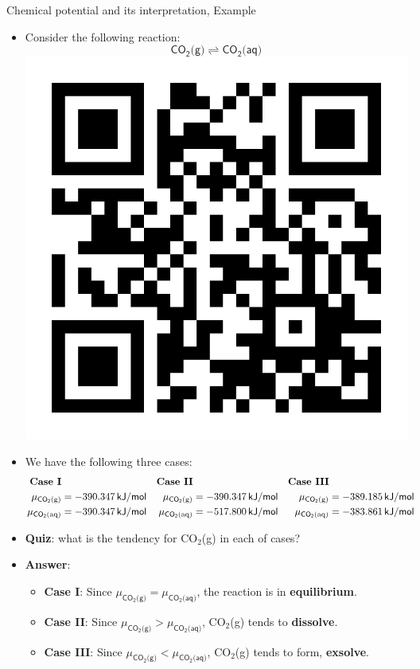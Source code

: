 \begin{frame}{Chemical potential and its interpretation, Example}
\begin{itemize}
\item Consider the following reaction:
\[
\mathsf{CO_{2}\text{(g)}\rightleftharpoons CO_{2}\text{(aq)}}
\]
\vskip -50pt
\includegraphics[height=0.17\columnwidth,right]{figures/chemical-equilibrium/poll-linear-independence.png}
\pause
\vskip -40pt
\item We have the following three cases: 
{
\footnotesize{}
\begin{align*}
\text{\textbf{Case I}} &  & \textbf{Case II} &  & \textbf{Case III}\\
\mu_{\mathsf{CO_{2}\text{(g)}}} & = -390.347\,{\mathsf{kJ/mol}} & 
\mu_{\mathsf{CO_{2}\text{(g)}}} & = -390.347\,{\mathsf{kJ/mol}} & 
\mu_{\mathsf{CO_{2}\text{(g)}}} & = -389.185\,{\mathsf{kJ/mol}}\\
\mu_{\mathsf{CO_{2}\text{(aq)}}} & = -390.347\,{\mathsf{kJ/mol}} & \mu_{\mathsf{CO_{2}\text{(aq)}}} & = -517.800\,{{\mathsf{kJ/mol}}} & \mu_{\mathsf{CO_{2}\text{(aq)}}} & =-383.861\,{\mathsf{kJ/mol}}
\end{align*}
}{\footnotesize\par}
\vskip 10pt 
%
\pause
\item \alert{\textbf{Quiz}}: what is the tendency for CO$_{2}$(g) in each of cases?
%
\hiddenpause
%
\item \alert{\textbf{Answer}}:
\begin{itemize}
\item \textbf{Case I}: Since $\mu_{\mathsf{CO_{2}\text{(g)}}}=\mu_{\mathsf{CO_{2}\text{(aq)}}}$,
the reaction is in \textbf{equilibrium}.
\item \textbf{Case II}: Since $\mu_{\mathsf{CO_{2}\text{(g)}}}>\mu_{\mathsf{CO_{2}\text{(aq)}}}$,
CO$_{2}$(g) tends to \textbf{dissolve}.
\item \textbf{Case III}: Since $\mu_{\mathsf{CO_{2}\text{(g)}}}<\mu_{\mathsf{CO_{2}\text{(aq)}}}$,
CO$_{2}$(g) tends to form, \textbf{exsolve}. 
\end{itemize}
\end{itemize}

\end{frame}
